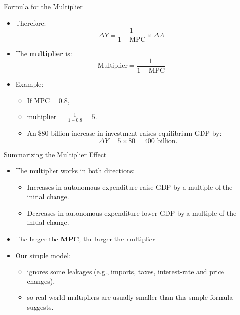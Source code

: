 \documentclass[aspectratio=169]{beamer}
\begin{document}
\begin{frame}{Formula for the Multiplier}
\transfade
\begin{itemize}
  \item Therefore:
  \[
    \Delta Y = \frac{1}{1 - \text{MPC}} \times \Delta A.
  \]
  \item The \textbf{multiplier} is:
  \[
    \text{Multiplier} = \frac{1}{1 - \text{MPC}}.
  \]
  \item Example:
  \begin{itemize}
    \item If \(\text{MPC} = 0.8\),
    \item multiplier \(= \frac{1}{1 - 0.8} = 5\).
    \item An \$80 billion increase in investment raises equilibrium GDP by:
    \[
      \Delta Y = 5 \times 80 = 400 \text{ billion}.
    \]
  \end{itemize}
\end{itemize}
\end{frame}

\begin{frame}{Summarizing the Multiplier Effect}
\transfade
\begin{itemize}
  \item The multiplier works in both directions:
  \begin{itemize}
    \item Increases in autonomous expenditure raise GDP by a multiple of the initial change.
    \item Decreases in autonomous expenditure lower GDP by a multiple of the initial change.
  \end{itemize}
  \item The larger the \textbf{MPC}, the larger the multiplier.
  \item Our simple model:
  \begin{itemize}
    \item ignores some leakages (e.g., imports, taxes, interest-rate and price changes),
    \item so real-world multipliers are usually smaller than this simple formula suggests.
  \end{itemize}
\end{itemize}
\end{frame}
\end{document}

